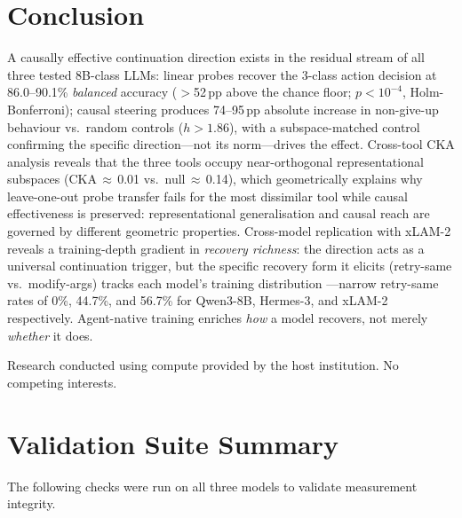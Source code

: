 \documentclass{article}
\begin{document}
\section{Conclusion}
\label{sec:conclusion}

A causally effective continuation direction exists in the residual
stream of all three tested 8B-class LLMs: linear probes recover the
3-class action decision at 86.0--90.1\% \emph{balanced} accuracy
($>$52\,pp above the chance floor; $p<10^{-4}$, Holm-Bonferroni); causal
steering produces 74--95\,pp absolute increase in non-give-up behaviour
vs.\ random controls ($h>1.86$), with a subspace-matched control
confirming the specific direction---not its norm---drives the effect.
Cross-tool CKA analysis reveals that the three tools occupy
near-orthogonal representational subspaces (CKA\,$\approx$\,0.01
vs.\ null\,$\approx$\,0.14), which geometrically explains why
leave-one-out probe transfer fails for the most dissimilar tool while
causal effectiveness is preserved: representational generalisation and
causal reach are governed by different geometric properties.
Cross-model replication with xLAM-2 reveals a training-depth gradient
in \emph{recovery richness}: the direction acts as a universal
continuation trigger, but the specific recovery form it elicits
(retry-same vs.\ modify-args) tracks each model's training distribution
---narrow retry-same rates of 0\%, 44.7\%, and 56.7\% for Qwen3-8B,
Hermes-3, and xLAM-2 respectively.
Agent-native training enriches \emph{how} a model recovers, not merely
\emph{whether} it does.

\begin{ack}
Research conducted using compute provided by the host institution.
No competing interests.
\end{ack}




\clearpage
\appendix
\section{Validation Suite Summary}
\label{app:gates}

The following checks were run on all three models to validate
measurement integrity.
\end{document}
